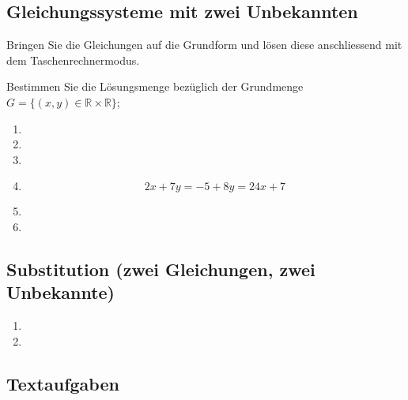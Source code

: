 \subsection{Gleichungssysteme mit zwei Unbekannten}

  Bringen Sie die Gleichungen auf die Grundform und lösen diese
  anschliessend mit dem Taschenrechnermodus.

  Bestimmen Sie die Lösungsmenge bezüglich der Grundmenge $G = \{(x,
  y) \in \mathbb{R}\times\mathbb{R}\}$;

\begin{multicols}{2}
  \begin{enumerate}
  \item
    

  \item

  \item

\item
  $$2x+7y = -5+8y = 24x +7$$
\item

\item
  
  \end{enumerate}
\end{multicols}


  \subsection{Substitution (zwei Gleichungen, zwei Unbekannte)}

\begin{multicols}{2}
  \begin{enumerate}
  \item

  \item
  \end{enumerate}
\end{multicols}

  \subsection{Textaufgaben}

